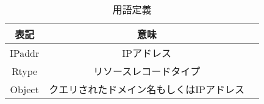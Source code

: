 \begin{table}[htb]
 \centering
  \begin{tabular}{ccc}
    \toprule
    表記 & 意味 \\
    \midrule
    IPaddr & IPアドレス \\
    Rtype & リソースレコードタイプ \\
    Object & クエリされたドメイン名もしくはIPアドレス
    \bottomrule
  \end{tabular}
 \label{tab:terminology}
 \caption{用語定義}
\end{table}
